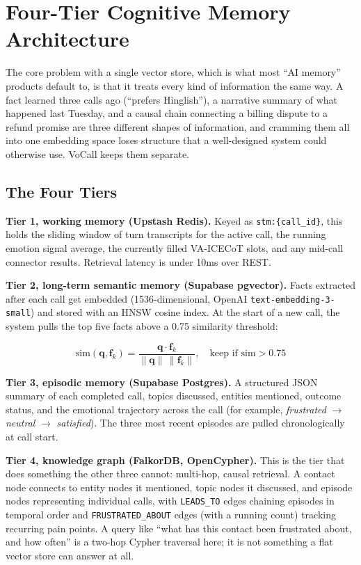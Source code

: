 \documentclass[conference]{IEEEtran}
\begin{document}
\section{Four-Tier Cognitive Memory Architecture}
\label{sec:memory}

The core problem with a single vector store, which is what most ``AI memory'' products default to, is that it treats every kind of information the same way. A fact learned three calls ago (``prefers Hinglish''), a narrative summary of what happened last Tuesday, and a causal chain connecting a billing dispute to a refund promise are three different shapes of information, and cramming them all into one embedding space loses structure that a well-designed system could otherwise use. VoCall keeps them separate.

\subsection{The Four Tiers}

\textbf{Tier 1, working memory (Upstash Redis).} Keyed as \texttt{stm:\{call\_id\}}, this holds the sliding window of turn transcripts for the active call, the running emotion signal average, the currently filled VA-ICECoT slots, and any mid-call connector results. Retrieval latency is under 10ms over REST.

\textbf{Tier 2, long-term semantic memory (Supabase pgvector).} Facts extracted after each call get embedded (1536-dimensional, OpenAI \texttt{text-embedding-3-small}) and stored with an HNSW cosine index. At the start of a new call, the system pulls the top five facts above a 0.75 similarity threshold:

\begin{equation}
\text{sim}(\mathbf{q}, \mathbf{f}_k) = \frac{\mathbf{q} \cdot \mathbf{f}_k}{\lVert \mathbf{q} \rVert \, \lVert \mathbf{f}_k \rVert}, \quad \text{keep if } \text{sim} > 0.75
\label{eq:cosine}
\end{equation}

\textbf{Tier 3, episodic memory (Supabase Postgres).} A structured JSON summary of each completed call, topics discussed, entities mentioned, outcome status, and the emotional trajectory across the call (for example, \textit{frustrated} $\rightarrow$ \textit{neutral} $\rightarrow$ \textit{satisfied}). The three most recent episodes are pulled chronologically at call start.

\textbf{Tier 4, knowledge graph (FalkorDB, OpenCypher).} This is the tier that does something the other three cannot: multi-hop, causal retrieval. A contact node connects to entity nodes it mentioned, topic nodes it discussed, and episode nodes representing individual calls, with \texttt{LEADS\_TO} edges chaining episodes in temporal order and \texttt{FRUSTRATED\_ABOUT} edges (with a running count) tracking recurring pain points. A query like ``what has this contact been frustrated about, and how often'' is a two-hop Cypher traversal here; it is not something a flat vector store can answer at all.
\end{document}
